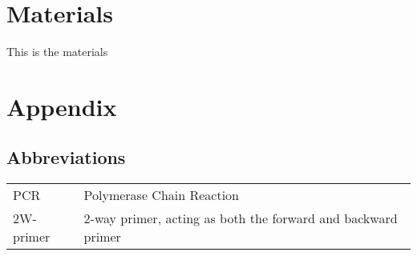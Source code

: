 		
		
\section{Materials} \label{sec:materials}
		This is the materials \cite{vinayagam_integrating_2014}
\printbibliography
\newpage
\section{Appendix}
\subsection{Abbreviations}
		\begin{tabular}[H]{l l}
			PCR 		& 	Polymerase Chain Reaction \\
			2W-primer 	& 	2-way primer, acting as both the forward and backward primer
		\end{tabular}

